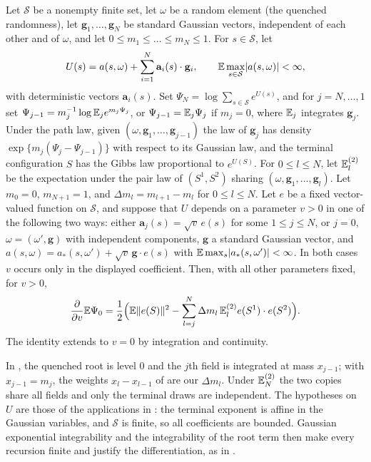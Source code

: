 \begin{proposition}\label{inp:ob-hierarchy-derivative}
Let $\mathcal S$ be a nonempty finite set, let $\omega$ be a random element (the
quenched randomness), let $\mathbf g_1,\dots,\mathbf g_N$ be standard Gaussian
vectors, independent of each other and of $\omega$, and let $0\le m_1\le\dots\le
m_N\le1$. For $s\in\mathcal S$, let
\[
 U(s)=a(s,\omega)+\sum_{i=1}^N\mathbf a_i(s)\cdot\mathbf g_i,
 \qquad\mathbb E\max_{s\in\mathcal S}\lvert a(s,\omega)\rvert<\infty,
\]
with deterministic vectors $\mathbf a_i(s)$. Set $\Psi_N=\log\sum_{s\in\mathcal S}e^{U(s)}$, and for $j=N,\dots,1$ set
$\Psi_{j-1}=m_j^{-1}\log\mathbb E_je^{m_j\Psi_j}$, or $\Psi_{j-1}=\mathbb E_j\Psi_j$ if
$m_j=0$, where $\mathbb E_j$ integrates $\mathbf g_j$. Under the path law, given
$(\omega,\mathbf g_1,\dots,\mathbf g_{j-1})$ the law of $\mathbf g_j$ has
density $\exp\{m_j(\Psi_j-\Psi_{j-1})\}$ with respect to its Gaussian law, and
the terminal configuration $S$ has the Gibbs law proportional to $e^{U(S)}$.
For $0\le l\le N$, let $\mathbb E_l^{(2)}$ be the expectation under the pair law of
$(S^1,S^2)$ sharing $(\omega,\mathbf g_1,\dots,\mathbf g_l)$. Let $m_0=0$,
$m_{N+1}=1$, and $\Delta m_l=m_{l+1}-m_l$ for $0\le l\le N$. Let $e$ be a fixed vector-valued function on $\mathcal S$, and suppose that
$U$ depends on a parameter $v>0$ in one of the following two ways: either
$\mathbf a_j(s)=\sqrt v\,e(s)$
for some $1\le j\le N$, or $j=0$, $\omega=(\omega',\mathbf g)$ with independent
components, $\mathbf g$ a standard Gaussian vector, and
$a(s,\omega)=a_*(s,\omega')+\sqrt v\,\mathbf g\cdot e(s)$ with
$\mathbb E\max_s\lvert a_*(s,\omega')\rvert<\infty$. In both cases $v$ occurs only in the
displayed coefficient. Then, with all other parameters fixed, for $v>0$,
\[
 \frac{\partial}{\partial v}\mathbb E\Psi_0
 =\frac12\Bigl(\mathbb E\lVert e(S)\rVert^2-\sum_{l=j}^N\Delta m_l\,\mathbb E_l^{(2)}e(S^1)\cdot e(S^2)\Bigr).
\]
The identity extends to $v=0$ by integration and continuity.
\end{proposition}

In \cite{oai-barriers}, the quenched root is level $0$ and the $j$th field is
integrated at mass $x_{j-1}$; with $x_{j-1}=m_j$, the weights
$x_l-x_{l-1}$ of \cite{oai-barriers} are our $\Delta m_l$. Under $\mathbb E_N^{(2)}$ the two
copies share all fields and only the terminal draws are independent. The
hypotheses on $U$ are those of the applications in \cite{oai-barriers}: the
terminal exponent is affine in the Gaussian variables, and $\mathcal S$ is
finite, so all coefficients are bounded. Gaussian exponential integrability and
the integrability of the root term then make every recursion finite and justify
the differentiation, as in \cite[proof of Lemma~2.2]{oai-barriers}.

